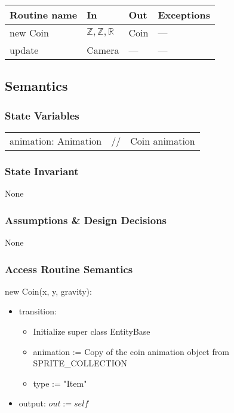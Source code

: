 \documentclass[12pt]{article}
\begin{document}
\begin{tabular}{| l | l | l | l |}
\hline
\textbf{Routine name} & \textbf{In} & \textbf{Out} & \textbf{Exceptions}\\
\hline
new Coin & $\mathbb{Z, Z, R}$ & Coin & ---\\
\hline
update & Camera & --- & ---\\
\hline
\end{tabular}

\subsection* {Semantics}

\subsubsection* {State Variables}
\begin{tabular}{lll}
animation: Animation & // & Coin animation
\end{tabular}

\subsubsection* {State Invariant}

None

\subsubsection* {Assumptions \& Design Decisions}

None

\subsubsection* {Access Routine Semantics}

new Coin(x, y, gravity):
\begin{itemize}
    \item transition: 
    \begin{itemize}[]
        \item Initialize super class EntityBase
        \item animation := Copy of the coin animation object from SPRITE\_COLLECTION
        \item type := "Item"
    \end{itemize}
    \item output: $out := self$
\end{itemize}
\end{document}
